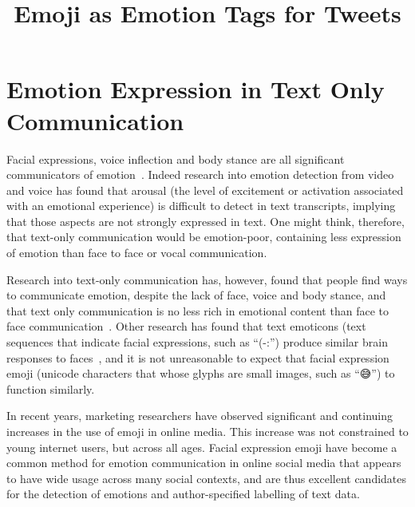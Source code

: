 \documentclass[10pt, a4paper]{article}
\title{Emoji as Emotion Tags for Tweets}
\begin{document}
\maketitleabstract

\section{Emotion Expression in Text Only Communication}
\label{sec:emotion_expression_in_text_only_communication}
Facial expressions, voice inflection and body stance are all significant communicators of emotion~\cite{Johnston2015Apa}. 
Indeed research into emotion detection from video and voice has found that arousal (the level of excitement or activation associated with an emotional experience) is 
difficult to detect in text transcripts, implying that those aspects are not strongly expressed in text.
One might think, therefore, that text-only communication would be emotion-poor, containing less expression of emotion than face to face or vocal communication.

Research into text-only communication has, however, found that people find ways to communicate emotion, despite the lack of face, voice and body stance, and that text only communication is no less rich in emotional content than face to face communication~\cite{Derks2008Role}.
Other research has found that text emoticons (text sequences that indicate facial expressions, such as ``(-:'') produce similar brain responses to faces~\cite{Churches2014Emoticons}, and it is not unreasonable to expect that facial expression emoji (unicode characters that whose glyphs are small images, such as ``😅'') to function similarly.

In recent years, marketing researchers have observed significant and continuing increases in the use of emoji in online media. This increase was not constrained to young internet users, but across all ages. 
Facial expression emoji have become a common method for emotion communication in online social media that appears to have wide usage across many social contexts, and are thus excellent candidates for the detection of emotions and author-specified labelling of text data.

\end{document}
